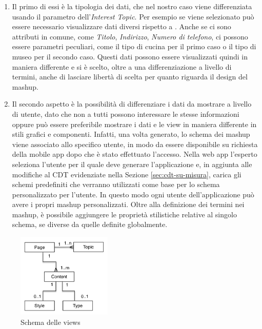 \begin{enumerate}
	\item
	Il primo di essi è la tipologia dei dati, che nel nostro caso viene differenziata usando il parametro dell'\emph{Interest Topic}.
	Per esempio se viene selezionato  può essere necessario visualizzare dati diversi rispetto a . Anche se ci sono attributi in comune, come \emph{Titolo}, \emph{Indirizzo}, \emph{Numero di telefono}, ci possono essere parametri peculiari, come il tipo di cucina per il primo caso o il tipo di museo per il secondo caso. Questi dati possono essere visualizzati quindi in maniera differente e si è scelto, oltre a una differenziazione a livello di termini, anche di lasciare libertà di scelta per quanto riguarda il design del mashup. 
	\item
	Il secondo aspetto è la possibilità di differenziare i dati da mostrare a livello di utente, dato che non a tutti possono interessare le stesse informazioni oppure può essere preferibile mostrare i dati e le view in maniera differente in stili grafici e componenti. Infatti, una volta generato, lo schema dei mashup viene associato allo specifico utente, in modo da essere disponibile su richiesta della mobile app dopo che è stato effettuato l'accesso.
	Nella web app l'esperto seleziona l'utente per il quale deve generare l'applicazione e, in aggiunta alle modifiche al CDT evidenziate nella Sezione \ref{sec:cdt-su-misura}, carica gli schemi predefiniti che verranno utilizzati come base per lo schema personalizzato per l'utente. In questo modo ogni utente dell'applicazione può avere i propri mashup personalizzati.
	Oltre alla definizione dei termini nei mashup, è possibile aggiungere le proprietà stilistiche relative al singolo schema, se diverse da quelle definite globalmente.
\end{enumerate}

\begin{figure}[ht]
	\centering
	\includegraphics[width=0.4\textwidth]{4-metodologia/Immagini/view-schema.png}
	\caption{Schema delle views}\label{fig:view-schema}
\end{figure}

